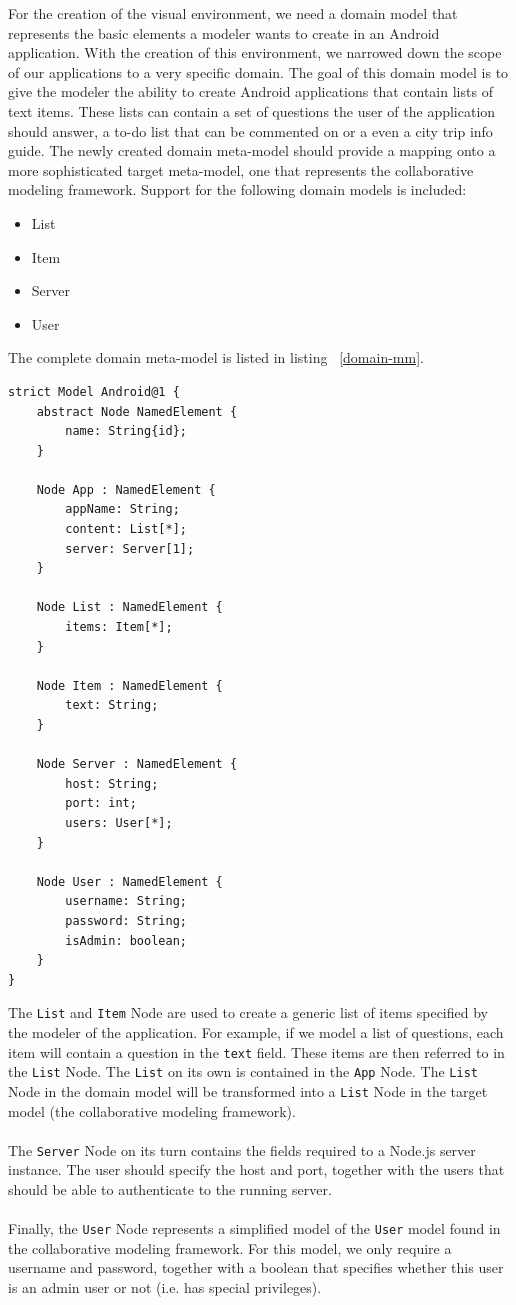 For the creation of the visual environment, we need a domain model that represents the basic elements a modeler wants to create in an Android application. With the creation of this environment, we narrowed down the scope of our applications to a very specific domain. The goal of this domain model is to give the modeler the ability to create Android applications that contain lists of text items. These lists can contain a set of questions the user of the application should answer, a to-do list that can be commented on or a even a city trip info guide. The newly created domain meta-model should provide a mapping onto a more sophisticated target meta-model, one that represents the collaborative modeling framework. Support for the following domain models is included:
\begin{itemize}
\item{List}
\item{Item}
\item{Server}
\item{User}
\end{itemize}
The complete domain meta-model is listed in listing ~\ref{domain-mm}.
\begin{lstlisting}[label=domain-mm,caption=Domain meta-model, captionpos=t]
strict Model Android@1 {
	abstract Node NamedElement {
		name: String{id};
	}

	Node App : NamedElement {
		appName: String;
		content: List[*];
		server: Server[1];
	}

	Node List : NamedElement {
		items: Item[*];
	}

	Node Item : NamedElement {
		text: String;
	}

	Node Server : NamedElement {
		host: String;
		port: int;
		users: User[*];
	}

	Node User : NamedElement {
		username: String;
		password: String;
		isAdmin: boolean;
	}
}
\end{lstlisting}
The \texttt{List} and \texttt{Item} Node are used to create a generic list of items specified by the modeler of the application. For example, if we model a list of questions, each item will contain a question in the \texttt{text} field. These items are then referred to in the \texttt{List} Node. The \texttt{List} on its own is contained in the \texttt{App} Node. The \texttt{List} Node in the domain model will be transformed into a \texttt{List} Node in the target model (the collaborative modeling framework). \\ \\
The \texttt{Server} Node on its turn contains the fields required to a Node.js server instance. The user should specify the host and port, together with the users that should be able to authenticate to the running server. \\ \\
Finally, the \texttt{User} Node represents a simplified model of the \texttt{User} model found in the collaborative modeling framework. For this model, we only require a username and password, together with a boolean that specifies whether this user is an admin user or not (i.e. has special privileges).

